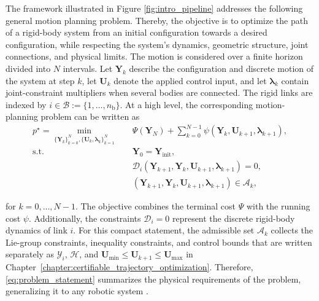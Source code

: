 The framework illustrated in Figure \ref{fig:intro_pipeline} addresses the
following general motion planning problem. Thereby, the objective is to optimize the path 
of a rigid-body system from
an initial configuration towards a desired configuration, while respecting the system's
dynamics, geometric structure, joint connections, and physical limits.
The motion is considered over a finite horizon divided into $N$ intervals. Let $\bm{Y}_k$ describe
the configuration and discrete motion of the system at step $k$, let $\bm{U}_k$ denote
the applied control input, and let $\bm{\lambda}_k$ contain joint-constraint multipliers
when several bodies are connected. The rigid links are indexed by
$i\in\mathcal B:=\{1,\ldots,n_{\mathrm b}\}$. At a high level, the corresponding
motion-planning problem can be written as
\begin{subequations}
\label{eq:problem_statement}
\begin{align}
p^\star =
\min_{\{\bm{Y}_k\}_{k=0}^{N},\{\bm{U}_k,\bm{\lambda}_k\}_{k=1}^{N}}
\quad & \Psi(\bm{Y}_N)+\sum_{k=0}^{N-1}\psi(\bm{Y}_k,\bm{U}_{k+1},\bm{\lambda}_{k+1}),
\label{eq:problem_statement_objective}\\
\text{s.t.}\quad
&\bm{Y}_0=\bm{Y}_{\mathrm{init}},
\label{eq:problem_statement_initial}\\
&\mathcal D_i(\bm{Y}_{k+1},\bm{Y}_k,\bm{U}_{k+1},\bm{\lambda}_{k+1})=0,
\label{eq:problem_statement_dynamics}\\
&(\bm{Y}_{k+1}, \bm{Y}_k,\bm{U}_{k+1},\bm{\lambda}_{k+1})\in\mathcal{A}_k,
\label{eq:problem_statement_admissible}
\end{align}
\end{subequations}

for $k=0,\ldots,N-1$. The objective combines the terminal cost $\Psi$ with the running cost $\psi$. Additionally, the
constraints $\mathcal D_i=0$ represent the discrete rigid-body dynamics of link $i$.
For this compact statement, the admissible set $\mathcal A_k$ collects the Lie-group constraints,
inequality constraints, and control bounds that are written separately as
$\mathcal Y_i$, $\mathcal H$, and $\bm{U}_{\min}\leq \bm{U}_{k+1}\leq \bm{U}_{\max}$ in
Chapter~\ref{chapter:certifiable_trajectory_optimization}. Therefore, \eqref{eq:problem_statement}
summarizes the physical requirements of the problem, generalizing it to any robotic system \cite{Kang_2026Fast}. 

